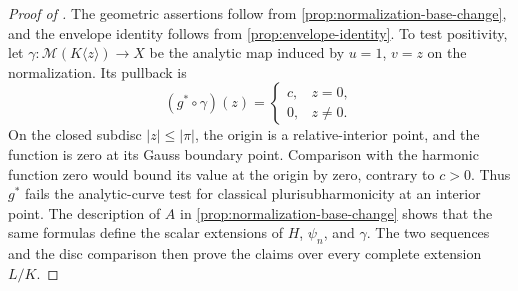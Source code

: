 \documentclass[11pt,a4paper]{amsart}
\begin{document}
\begin{proof}[Proof of ]
The geometric assertions follow from \cref{prop:normalization-base-change}, and the envelope identity follows from \cref{prop:envelope-identity}. To test positivity, let $\gamma:\mathcal M(K\langle z\rangle)\to X$ be the analytic map induced by $u=1$, $v=z$ on the normalization. Its pullback is
\[
 (g^*\circ\gamma)(z)=
 \begin{cases}
 c,&z=0,\\
 0,&z\neq0.
 \end{cases}
\]
On the closed subdisc $|z|\leq|\pi|$, the origin is a relative-interior point, and the function is zero at its Gauss boundary point. Comparison with the harmonic function zero would bound its value at the origin by zero, contrary to $c>0$. Thus $g^*$ fails the analytic-curve test for classical plurisubharmonicity at an interior point. The description of $A$ in \cref{prop:normalization-base-change} shows that the same formulas define the scalar extensions of $H$, $\psi_n$, and $\gamma$. The two sequences and the disc comparison then prove the claims over every complete extension $L/K$.
\end{proof}

\printbibliography
\end{document}

